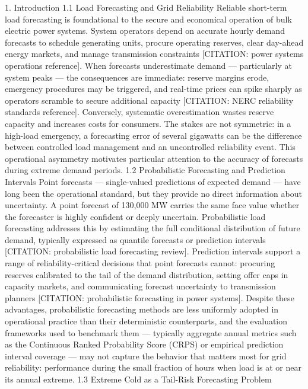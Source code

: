 1. Introduction
1.1 Load Forecasting and Grid Reliability
Reliable short-term load forecasting is foundational to the secure and economical operation of bulk electric power systems. System operators depend on accurate hourly demand forecasts to schedule generating units, procure operating reserves, clear day-ahead energy markets, and manage transmission constraints [CITATION: power systems operations reference]. When forecasts underestimate demand — particularly at system peaks — the consequences are immediate: reserve margins erode, emergency procedures may be triggered, and real-time prices can spike sharply as operators scramble to secure additional capacity [CITATION: NERC reliability standards reference]. Conversely, systematic overestimation wastes reserve capacity and increases costs for consumers. The stakes are not symmetric: in a high-load emergency, a forecasting error of several gigawatts can be the difference between controlled load management and an uncontrolled reliability event. This operational asymmetry motivates particular attention to the accuracy of forecasts during extreme demand periods.
1.2 Probabilistic Forecasting and Prediction Intervals
Point forecasts — single-valued predictions of expected demand — have long been the operational standard, but they provide no direct information about uncertainty. A point forecast of 130,000 MW carries the same face value whether the forecaster is highly confident or deeply uncertain. Probabilistic load forecasting addresses this by estimating the full conditional distribution of future demand, typically expressed as quantile forecasts or prediction intervals [CITATION: probabilistic load forecasting review]. Prediction intervals support a range of reliability-critical decisions that point forecasts cannot: procuring reserves calibrated to the tail of the demand distribution, setting offer caps in capacity markets, and communicating forecast uncertainty to transmission planners [CITATION: probabilistic forecasting in power systems]. Despite these advantages, probabilistic forecasting methods are less uniformly adopted in operational practice than their deterministic counterparts, and the evaluation frameworks used to benchmark them — typically aggregate annual metrics such as the Continuous Ranked Probability Score (CRPS) or empirical prediction interval coverage — may not capture the behavior that matters most for grid reliability: performance during the small fraction of hours when load is at or near its annual extreme.
1.3 Extreme Cold as a Tail-Risk Forecasting Problem
